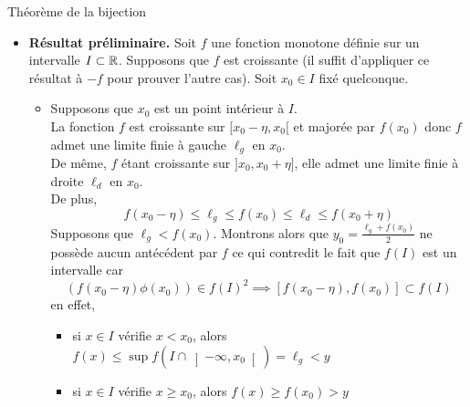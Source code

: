 \documentclass{article}
\begin{document}
\begin{question_kholle}
	{Théorème de la bijection}
	\hfill\\
	\begin{itemize}[label=$\vartriangleright$]
		\item \textbf{Résultat préliminaire.} Soit $f$ une fonction monotone définie sur un intervalle $I\subset\mathbb R$.
		      Supposons que $f$ est croissante (il suffit d’appliquer ce résultat à $-f$ pour prouver l’autre cas). Soit $x_{0}\in I$ fixé quelconque.\\
		      \begin{itemize}[label=$\star$]
			      \item
			            Supposons que $x_{0}$ est un point intérieur à $I$.\\
			            La fonction $f$ est croissante sur $[x_{0}-\eta,x_{0}[$ et majorée par $f(x_{0})$ donc $f$ admet une limite finie à gauche $\ell_{g}$ en $x_{0}$.\\
			            De même, $f$ étant croissante sur $]x_{0}, x_{0}+\eta]$, elle admet une limite finie à droite $\ell_{d}$ en $x_{0}$.\\
			            De plus,
			            \begin{equation*}
				            f(x_{0}-\eta)\leq \ell_{g} \leq f(x_{0})\leq \ell_{d} \leq f(x_{0}+\eta)
			            \end{equation*}
			            Supposons que $\ell_{g}<f(x_{0})$. Montrons alors que $y_{0}=\frac{\ell_{g}+f(x_{0})}{2}$ ne possède aucun antécédent par $f$ ce qui contredit le fait que $f(I)$ est un intervalle car
			            \begin{equation*}
				            \left(f(x_{0}-\eta)\phi(x_{0})\right)\in f(I)^{2} \implies  \left[f(x_{0}-\eta), f(x_{0})\right]\subset f(I)
			            \end{equation*}
			            en effet,
			            \begin{itemize}
				            \item si $x\in I$ vérifie $x<x_{0}$, alors $f(x)\leq \sup f(I\cap \left]-\infty,x_{0}\right[)=\ell_{g}<y$
				            \item si $x\in I$ vérifie $x\geq x_{0}$, alors $f(x)\geq f(x_{0})>y$

\end{itemize}
\end{itemize}
\end{itemize}
\end{question_kholle}
\end{document}
